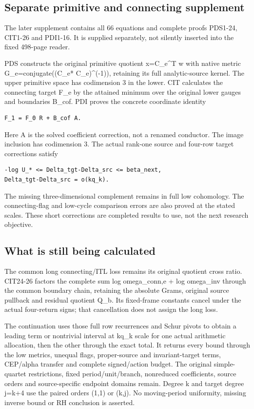 \documentclass[
]{article}
\begin{document}
\subsection{Separate primitive and connecting
supplement}\label{separate-primitive-and-connecting-supplement}

The later supplement contains all 66 equations and complete proofs
PDS1-24, CIT1-26 and PDI1-16. It is supplied separately, not silently
inserted into the fixed 498-page reader.

PDS constructs the original primitive quotient x=C\_e\^{}T w with native
metric G\_e=conjugate((C\_e* C\_e)\^{}(-1)), retaining its full
analytic-source kernel. The upper primitive space has codimension 3 in
the lower. CIT calculates the connecting target F\_e by the attained
minimum over the original lower gauges and boundaries B\_cof. PDI proves
the concrete coordinate identity

\begin{verbatim}
F_1 = F_0 R + B_cof A.
\end{verbatim}

Here A is the solved coefficient correction, not a renamed conductor.
The image inclusion has codimension 3. The actual rank-one source and
four-row target corrections satisfy

\begin{verbatim}
-log U_* <= Delta_tgt-Delta_src <= beta_next,
Delta_tgt-Delta_src = o(kq_k).
\end{verbatim}

The missing three-dimensional complement remains in full low cohomology.
The connecting-flag and low-cycle comparison errors are also proved at
the stated scales. These short corrections are completed results to use,
not the next research objective.

\subsection{What is still being
calculated}\label{what-is-still-being-calculated}

The common long connecting/ITL loss remains its original quotient cross
ratio. CIT24-26 factors the complete sum log omega\_conn,e + log
omega\_inv through the common boundary chain, retaining the absolute
Grams, original source pullback and residual quotient Q\_b. Its
fixed-frame constants cancel under the actual four-return signs; that
cancellation does not assign the long loss.

The continuation uses those full row recurrences and Schur pivots to
obtain a leading term or nontrivial interval at kq\_k scale for one
actual arithmetic allocation, then the other through the exact total. It
returns every bound through the low metrics, unequal flags,
proper-source and invariant-target terms, CEP/alpha transfer and
complete signed/action budget. The original simple-quartet restrictions,
fixed period/unit/branch, nonreduced coefficients, source orders and
source-specific endpoint domains remain. Degree k and target degree
j=k+4 use the paired orders (1,1) or (k,j). No moving-period uniformity,
missing inverse bound or RH conclusion is asserted.
\end{document}
